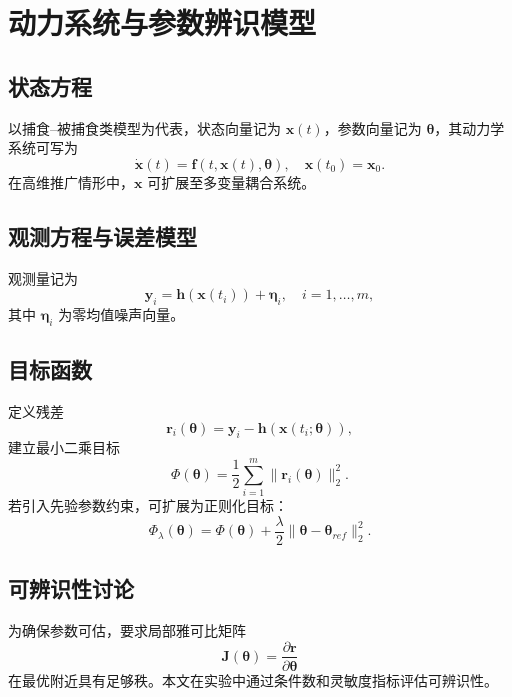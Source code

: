 \chapter{动力系统与参数辨识模型}

\section{状态方程}
以捕食--被捕食类模型为代表，状态向量记为 $\mathbf{x}(t)$，参数向量记为 $\boldsymbol{\theta}$，其动力学系统可写为
\[
\dot{\mathbf{x}}(t)=\mathbf{f}(t,\mathbf{x}(t),\boldsymbol{\theta}),\quad \mathbf{x}(t_0)=\mathbf{x}_0.
\]
在高维推广情形中，$\mathbf{x}$ 可扩展至多变量耦合系统。

\section{观测方程与误差模型}
观测量记为
\[
\mathbf{y}_i=\mathbf{h}(\mathbf{x}(t_i))+\boldsymbol{\eta}_i,\quad i=1,\ldots,m,
\]
其中 $\boldsymbol{\eta}_i$ 为零均值噪声向量。

\section{目标函数}
定义残差
\[
\mathbf{r}_i(\boldsymbol{\theta})=\mathbf{y}_i-\mathbf{h}(\mathbf{x}(t_i;\boldsymbol{\theta})),
\]
建立最小二乘目标
\[
\Phi(\boldsymbol{\theta})=\frac{1}{2}\sum_{i=1}^{m}\|\mathbf{r}_i(\boldsymbol{\theta})\|_2^2.
\]
若引入先验参数约束，可扩展为正则化目标：
\[
\Phi_\lambda(\boldsymbol{\theta})=\Phi(\boldsymbol{\theta})+\frac{\lambda}{2}\|\boldsymbol{\theta}-\boldsymbol{\theta}_{ref}\|_2^2.
\]

\section{可辨识性讨论}
为确保参数可估，要求局部雅可比矩阵
\[
\mathbf{J}(\boldsymbol{\theta})=\frac{\partial \mathbf{r}}{\partial \boldsymbol{\theta}}
\]
在最优附近具有足够秩。本文在实验中通过条件数和灵敏度指标评估可辨识性。
